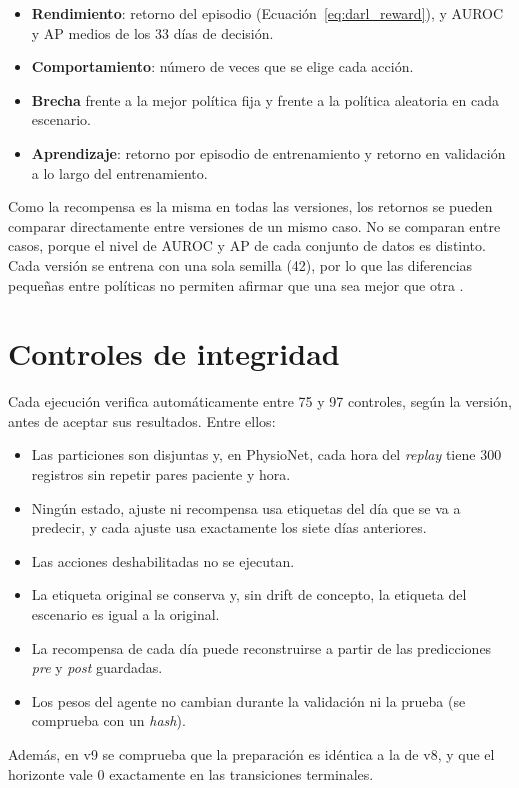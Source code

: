 \begin{itemize}
    \item \textbf{Rendimiento}: retorno del episodio (Ecuación~\ref{eq:darl_reward}), y AUROC y
    AP medios de los 33 días de decisión.
    \item \textbf{Comportamiento}: número de veces que se elige cada acción.
    \item \textbf{Brecha} frente a la mejor política fija y frente a la política aleatoria en
    cada escenario.
    \item \textbf{Aprendizaje}: retorno por episodio de entrenamiento y retorno en validación a
    lo largo del entrenamiento.
\end{itemize}

Como la recompensa es la misma en todas las versiones, los retornos se pueden comparar
directamente entre versiones de un mismo caso. No se comparan entre casos, porque el nivel de
AUROC y AP de cada conjunto de datos es distinto. Cada versión se entrena con una sola semilla
(42), por lo que las diferencias pequeñas entre políticas no permiten afirmar que una sea mejor
que otra \cite{henderson2018matters}.

\section{Controles de integridad}
\label{sec:met_integridad}

Cada ejecución verifica automáticamente entre 75 y 97 controles, según la versión, antes de
aceptar sus resultados. Entre ellos:

\begin{itemize}
    \item Las particiones son disjuntas y, en PhysioNet, cada hora del \textit{replay} tiene 300 registros sin repetir pares paciente y hora.
    \item Ningún estado, ajuste ni recompensa usa etiquetas del día que se va a predecir, y cada ajuste usa exactamente los siete días anteriores.
    \item Las acciones deshabilitadas no se ejecutan.
    \item La etiqueta original se conserva y, sin drift de concepto, la etiqueta del escenario es igual a la original.
    \item La recompensa de cada día puede reconstruirse a partir de las predicciones \textit{pre} y \textit{post} guardadas.
    \item Los pesos del agente no cambian durante la validación ni la prueba (se comprueba con un \textit{hash}).
\end{itemize}

Además, en v9 se comprueba que la preparación es idéntica a la de v8, y que el horizonte vale
0 exactamente en las transiciones terminales.
